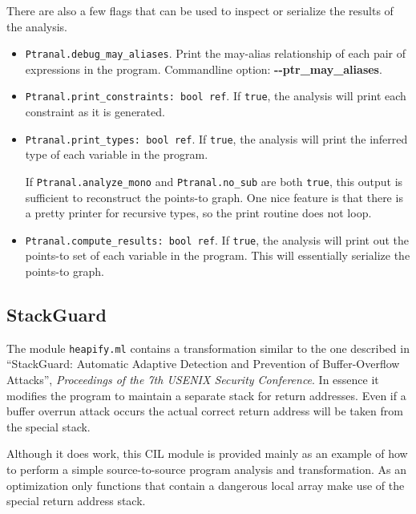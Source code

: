 \documentclass{article}
\def\t#1{{\tt #1}}
\begin{document}
There are also a few flags that can be used to inspect or serialize
the results of the analysis.
\begin{itemize}
\item \t{Ptranal.debug\_may\_aliases}.
  Print the may-alias relationship of each pair of expressions in the
  program.  Commandline option: {\bf -{}-ptr\_may\_aliases}.
\item \t{Ptranal.print\_constraints: bool ref}.
  If \t{true}, the analysis will print each constraint as it is
  generated.
\item \t{Ptranal.print\_types: bool ref}.
  If \t{true}, the analysis will print the inferred type of each
  variable in the program.

  If \t{Ptranal.analyze\_mono} and \t{Ptranal.no\_sub} are both
  \t{true}, this output is sufficient to reconstruct the points-to
  graph.  One nice feature is that there is a pretty printer for
  recursive types, so the print routine does not loop.
\item \t{Ptranal.compute\_results: bool ref}.
  If \t{true}, the analysis will print out the points-to set of each
  variable in the program.  This will essentially serialize the
  points-to graph.
\end{itemize}

\subsection{StackGuard}

The module \t{heapify.ml} contains a transformation similar to the one
described in ``StackGuard: Automatic Adaptive Detection and Prevention of
Buffer-Overflow Attacks'', {\em Proceedings of the 7th USENIX Security
Conference}. In essence it modifies the program to maintain a separate
stack for return addresses. Even if a buffer overrun attack occurs the
actual correct return address will be taken from the special stack. 

Although it does work, this CIL module is provided mainly as an example of
how to perform a simple source-to-source program analysis and
transformation. As an optimization only functions that contain a dangerous
local array make use of the special return address stack. 
\end{document}

